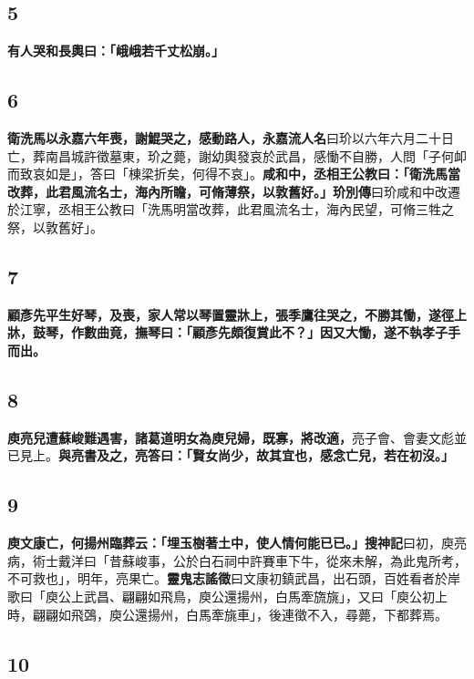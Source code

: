 \subsection*{5}

\textbf{有人哭和長輿曰：「峨峨若千丈松崩。」}

\subsection*{6}

\textbf{衛洗馬以永嘉六年喪，謝鯤哭之，感動路人，}{\footnotesize \textbf{永嘉流人名}曰玠以六年六月二十日亡，葬南昌城許徵墓東，玠之薨，謝幼輿發哀於武昌，感慟不自勝，人問「子何卹而致哀如是」，答曰「棟梁折矣，何得不哀」。}\textbf{咸和中，丞相王公教曰：「衛洗馬當改葬，此君風流名士，海內所瞻，可脩薄祭，以敦舊好。」}{\footnotesize \textbf{玠別傳}曰玠咸和中改遷於江寧，丞相王公教曰「洗馬明當改葬，此君風流名士，海內民望，可脩三牲之祭，以敦舊好」。}

\subsection*{7}

\textbf{顧彥先平生好琴，及喪，家人常以琴置靈牀上，張季鷹往哭之，不勝其慟，遂徑上牀，鼓琴，作數曲竟，撫琴曰：「顧彥先頗復賞此不？」因又大慟，遂不執孝子手而出。}

\subsection*{8}

\textbf{庾亮兒遭蘇峻難遇害，諸葛道明女為庾兒婦，既寡，將改適，}{\footnotesize 亮子會、會妻文彪並已見上。}\textbf{與亮書及之，亮答曰：「賢女尚少，故其宜也，感念亡兒，若在初沒。」}

\subsection*{9}

\textbf{庾文康亡，何揚州臨葬云：「埋玉樹著土中，使人情何能已已。」}{\footnotesize \textbf{搜神記}曰初，庾亮病，術士戴洋曰「昔蘇峻事，公於白石祠中許賽車下牛，從來未解，為此鬼所考，不可救也」，明年，亮果亡。\textbf{靈鬼志謠徵}曰文康初鎮武昌，出石頭，百姓看者於岸歌曰「庾公上武昌、翩翩如飛鳥，庾公還揚州，白馬牽旒旐」，又曰「庾公初上時，翩翩如飛鵶，庾公還揚州，白馬牽旐車」，後連徵不入，尋薨，下都葬焉。}

\subsection*{10}

